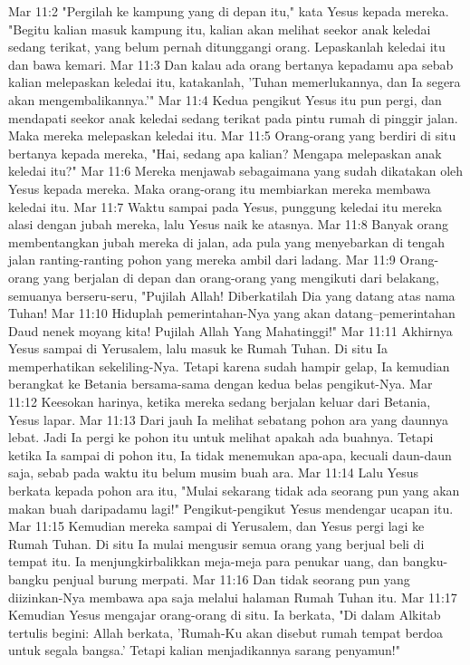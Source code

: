 Mar 11:2  "Pergilah ke kampung yang di depan itu," kata Yesus kepada mereka. "Begitu kalian masuk kampung itu, kalian akan melihat seekor anak keledai sedang terikat, yang belum pernah ditunggangi orang. Lepaskanlah keledai itu dan bawa kemari.
Mar 11:3  Dan kalau ada orang bertanya kepadamu apa sebab kalian melepaskan keledai itu, katakanlah, 'Tuhan memerlukannya, dan Ia segera akan mengembalikannya.'"
Mar 11:4  Kedua pengikut Yesus itu pun pergi, dan mendapati seekor anak keledai sedang terikat pada pintu rumah di pinggir jalan. Maka mereka melepaskan keledai itu.
Mar 11:5  Orang-orang yang berdiri di situ bertanya kepada mereka, "Hai, sedang apa kalian? Mengapa melepaskan anak keledai itu?"
Mar 11:6  Mereka menjawab sebagaimana yang sudah dikatakan oleh Yesus kepada mereka. Maka orang-orang itu membiarkan mereka membawa keledai itu.
Mar 11:7  Waktu sampai pada Yesus, punggung keledai itu mereka alasi dengan jubah mereka, lalu Yesus naik ke atasnya.
Mar 11:8  Banyak orang membentangkan jubah mereka di jalan, ada pula yang menyebarkan di tengah jalan ranting-ranting pohon yang mereka ambil dari ladang.
Mar 11:9  Orang-orang yang berjalan di depan dan orang-orang yang mengikuti dari belakang, semuanya berseru-seru, "Pujilah Allah! Diberkatilah Dia yang datang atas nama Tuhan!
Mar 11:10  Hiduplah pemerintahan-Nya yang akan datang--pemerintahan Daud nenek moyang kita! Pujilah Allah Yang Mahatinggi!"
Mar 11:11  Akhirnya Yesus sampai di Yerusalem, lalu masuk ke Rumah Tuhan. Di situ Ia memperhatikan sekeliling-Nya. Tetapi karena sudah hampir gelap, Ia kemudian berangkat ke Betania bersama-sama dengan kedua belas pengikut-Nya.
Mar 11:12  Keesokan harinya, ketika mereka sedang berjalan keluar dari Betania, Yesus lapar.
Mar 11:13  Dari jauh Ia melihat sebatang pohon ara yang daunnya lebat. Jadi Ia pergi ke pohon itu untuk melihat apakah ada buahnya. Tetapi ketika Ia sampai di pohon itu, Ia tidak menemukan apa-apa, kecuali daun-daun saja, sebab pada waktu itu belum musim buah ara.
Mar 11:14  Lalu Yesus berkata kepada pohon ara itu, "Mulai sekarang tidak ada seorang pun yang akan makan buah daripadamu lagi!" Pengikut-pengikut Yesus mendengar ucapan itu.
Mar 11:15  Kemudian mereka sampai di Yerusalem, dan Yesus pergi lagi ke Rumah Tuhan. Di situ Ia mulai mengusir semua orang yang berjual beli di tempat itu. Ia menjungkirbalikkan meja-meja para penukar uang, dan bangku-bangku penjual burung merpati.
Mar 11:16  Dan tidak seorang pun yang diizinkan-Nya membawa apa saja melalui halaman Rumah Tuhan itu.
Mar 11:17  Kemudian Yesus mengajar orang-orang di situ. Ia berkata, "Di dalam Alkitab tertulis begini: Allah berkata, 'Rumah-Ku akan disebut rumah tempat berdoa untuk segala bangsa.' Tetapi kalian menjadikannya sarang penyamun!"
